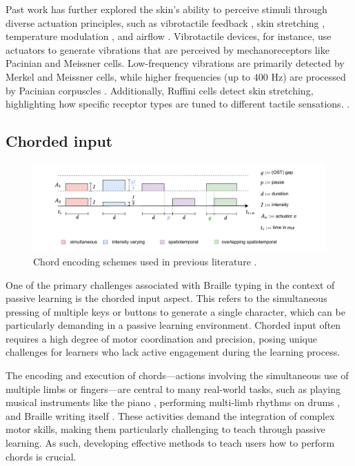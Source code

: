 Past work has further explored the skin's ability to perceive stimuli through diverse actuation principles, such as vibrotactile feedback \cite{Fang2020}, skin stretching \cite{wang2019masque}, temperature modulation \cite{peiris2019thermalbracelet}, and airflow \cite{tseng2020skin}. Vibrotactile devices, for instance, use actuators to generate vibrations that are perceived by mechanoreceptors like Pacinian and Meissner cells. Low-frequency vibrations are primarily detected by Merkel and Meissner cells, while higher frequencies (up to 400 Hz) are processed by Pacinian corpuscles \cite{Fang2022a, lo1984regional}. Additionally, Ruffini cells detect skin stretching, highlighting how specific receptor types are tuned to different tactile sensations. \cite{Fang2022a, lo1984regional, Fang2022a}.


\subsection*{Chorded input}


\begin{figure}
    \centering
    \includegraphics[width=\linewidth]{src//pictures/ost_diagram.drawio.pdf}
    \caption{Chord encoding schemes used in previous literature \cite{Luzhnica2017,Luzhnica2016,Luzhnica2018,Luzhnica2018a}.}
    \label{fig:chord_encoding}
\end{figure}

One of the primary challenges associated with Braille typing in the context of passive learning is the chorded input aspect. This refers to the simultaneous pressing of multiple keys or buttons to generate a single character, which can be particularly demanding in a passive learning environment. Chorded input often requires a high degree of motor coordination and precision, posing unique challenges for learners who lack active engagement during the learning process.

The encoding and execution of chords—actions involving the simultaneous use of multiple limbs or fingers—are central to many real-world tasks, such as playing musical instruments like the piano \cite{Seim2014, Seim2015b, Huang2008, Kohlsdorf2010, Huang2010, Seim2014a, Vaio6810, Donchev2021, Fang2023a, Fang2023}, performing multi-limb rhythms on drums \cite{Bouwer2011, Holland2010}, and Braille writing itself \cite{Learning2024, Seim2017, Seim2014a}. These activities demand the integration of complex motor skills, making them particularly challenging to teach through passive learning. As such, developing effective methods to teach users how to perform chords is crucial.

